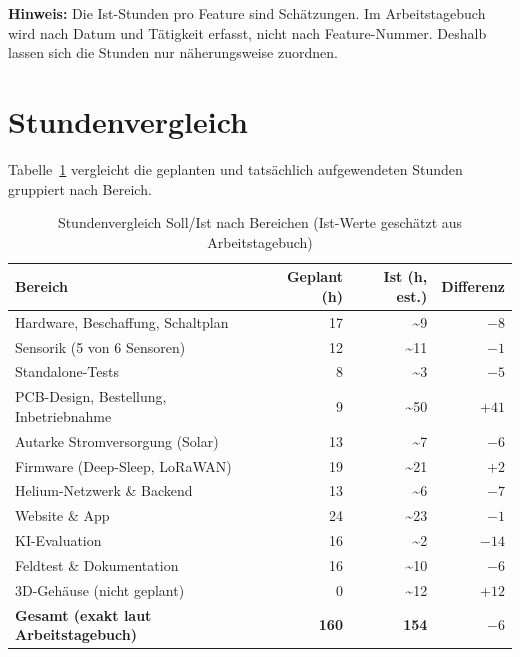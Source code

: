 \documentclass[11pt,a4paper]{scrartcl}
\begin{document}
\noindent\textbf{Hinweis:} Die Ist-Stunden pro Feature sind Schätzungen. Im Arbeitstagebuch
wird nach Datum und Tätigkeit erfasst, nicht nach Feature-Nummer. Deshalb lassen sich
die Stunden nur näherungsweise zuordnen.


\section{Stundenvergleich}

Tabelle~\ref{tab:stunden} vergleicht die geplanten und tatsächlich aufgewendeten Stunden
gruppiert nach Bereich.

\begin{table}[H]
  \centering
  \begin{tabularx}{\textwidth}{X r r r}
    \toprule
    \textbf{Bereich} & \textbf{Geplant (h)} & \textbf{Ist (h, est.)} & \textbf{Differenz} \\
    \midrule
    Hardware, Beschaffung, Schaltplan & 17 & \textasciitilde9 & $-8$ \\
    Sensorik (5 von 6 Sensoren) & 12 & \textasciitilde11 & $-1$ \\
    Standalone-Tests & 8 & \textasciitilde3 & $-5$ \\
    PCB-Design, Bestellung, Inbetriebnahme & 9 & \textasciitilde50 & $+41$ \\
    Autarke Stromversorgung (Solar) & 13 & \textasciitilde7 & $-6$ \\
    Firmware (Deep-Sleep, LoRaWAN) & 19 & \textasciitilde21 & $+2$ \\
    Helium-Netzwerk \& Backend & 13 & \textasciitilde6 & $-7$ \\
    Website \& App & 24 & \textasciitilde23 & $-1$ \\
    KI-Evaluation & 16 & \textasciitilde2 & $-14$ \\
    Feldtest \& Dokumentation & 16 & \textasciitilde10 & $-6$ \\
    3D-Gehäuse (nicht geplant) & 0 & \textasciitilde12 & $+12$ \\
    \midrule
    \textbf{Gesamt (exakt laut Arbeitstagebuch)} & \textbf{160} & \textbf{154} & $-6$ \\
    \bottomrule
  \end{tabularx}
  \caption{Stundenvergleich Soll/Ist nach Bereichen (Ist-Werte geschätzt aus Arbeitstagebuch)}
  \label{tab:stunden}
\end{table}
\end{document}
